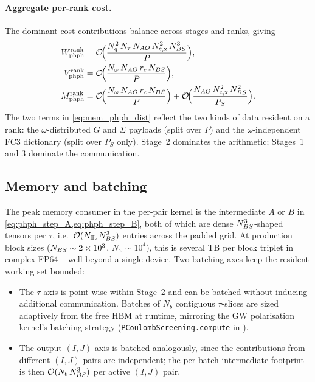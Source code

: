 \paragraph{Aggregate per-rank cost.} The dominant cost contributions
balance across stages and ranks, giving
\begin{align}
  W^\mathrm{rank}_\mathrm{phph}
    &= \mathcal{O}\!\Bigl(\frac{N_q^{2}\,N_\tau\,N_{AO}\,N_\mathrm{c,x}^{2}\,N_{BS}^{3}}{P}\Bigr),
    \label{eq:cost_phph_dist}\\
  V^\mathrm{rank}_\mathrm{phph}
    &= \mathcal{O}\!\Bigl(\frac{N_\omega\,N_{AO}\,r_c\,N_{BS}}{P}\Bigr),
    \label{eq:vol_phph_dist}\\
  M^\mathrm{rank}_\mathrm{phph}
    &= \mathcal{O}\!\Bigl(\frac{N_\omega\,N_{AO}\,r_c\,N_{BS}}{P}\Bigr)
       + \mathcal{O}\!\Bigl(\frac{N_{AO}\,N_\mathrm{c,x}^{2}\,N_{BS}^{2}}{P_S}\Bigr).
    \label{eq:mem_phph_dist}
\end{align}
The two terms in \cref{eq:mem_phph_dist} reflect the two kinds of
data resident on a rank: the $\omega$-distributed $G$ and $\Sigma$
payloads (split over $P$) and the $\omega$-independent FC3
dictionary (split over $P_S$ only). Stage~2 dominates the
arithmetic; Stages~1 and 3 dominate the communication.

\subsection{Memory and batching}
\label{ssec:phph_memory}

The peak memory consumer in the per-pair kernel is the intermediate
$A$ or $B$ in \cref{eq:phph_step_A,eq:phph_step_B}, both of which
are dense $N_{BS}^{3}$-shaped tensors per $\tau$, i.e.\
$\mathcal{O}(N_\mathrm{fft}\,N_{BS}^{3})$ entries across the padded grid.
At production block sizes ($N_{BS}\sim 2\times 10^{3}$,
$N_\omega\sim 10^{4}$), this is several TB per block triplet in
complex FP64 -- well beyond a single device. Two batching axes keep
the resident working set bounded:
\begin{itemize}
  \item The $\tau$-axis is point-wise within Stage~2 and can be
        batched without inducing additional communication. Batches
        of $N_b$ contiguous $\tau$-slices are sized adaptively from
        the free HBM at runtime, mirroring the GW polarisation
        kernel's batching strategy (\texttt{PCoulombScreening.compute}
        in \cite{vetsch_ab-initio_2025}).
  \item The output $(I,J)$-axis is batched analogously, since the
        contributions from different $(I,J)$ pairs are independent;
        the per-batch intermediate footprint is then
        $\mathcal{O}(N_b\,N_{BS}^{3})$ per active $(I,J)$ pair.
\end{itemize}

